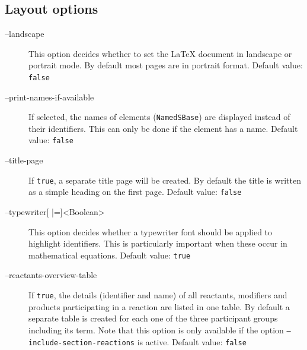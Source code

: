 \subsection{Layout options}
\begin{description}
\item[--landscape]
  This option decides whether to set the \LaTeX{} document in landscape
  or portrait mode. By default most pages are in portrait format.
  Default value: \texttt{false}

\item[--print-names-if-available]
  If selected, the names of \SBML elements (\texttt{NamedSBase}) are displayed
  instead of their identifiers. This can only be done if the element
  has a name.
  Default value: \texttt{false}

\item[--title-page]
  If \texttt{true}, a separate title page will be created. By default the
  title is written as a simple heading on the first page.
  Default value: \texttt{false}

\item[--typewriter{[} |={]}<Boolean>]
  This option decides whether a typewriter font should be applied
  to highlight \SBML identifiers. This is particularly important
  when these occur in mathematical equations.
  Default value: \texttt{true}

\item[--reactants-overview-table]
  If \texttt{true}, the details (identifier and name) of all reactants,
  modifiers and products participating in a reaction are listed
  in one table. By default a separate table is created for each
  one of the three participant groups including its \SBO term.
  Note that this option is only available if the option
  \texttt{--include-section-reactions} is active.
  Default value: \texttt{false}
\end{description}

